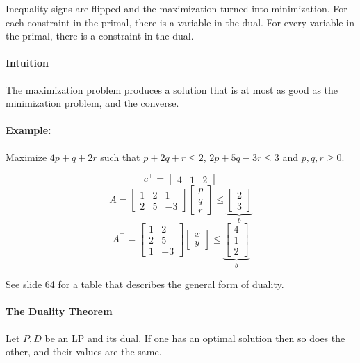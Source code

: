 \documentclass[a4paper]{article}
\begin{document}
Inequality signs are flipped and the maximization turned into minimization. For each constraint in the primal, there is a variable in the dual. For every variable in the primal, there is a constraint in the dual.

\paragraph{Intuition}
The maximization problem produces a solution that is at most as good as the minimization problem, and the converse.

\paragraph{Example:}
Maximize $4p+q+2r$ such that $p + 2q + r \le 2$, $2p+5q-3r \le 3$ and $p,q,r \ge 0$.

\[c^\intercal= \begin{bmatrix}4 & 1 & 2\end{bmatrix}\]
\[A=\begin{bmatrix}1 & 2 & 1 \\ 2 & 5 & -3\end{bmatrix} \begin{bmatrix}p \\ q \\ r\end{bmatrix} \le \underbrace{\begin{bmatrix}2 \\ 3\end{bmatrix}}_{b}\]
\[A^\intercal=\begin{bmatrix}1 & 2 \\ 2 & 5 \\ 1 & -3\end{bmatrix} \begin{bmatrix}x \\ y\end{bmatrix} \le \underbrace{\begin{bmatrix}4 \\ 1 \\ 2\end{bmatrix}}_{b}\]

See slide 64 for a table that describes the general form of duality.

\paragraph{The Duality Theorem}
Let $P, D$ be an LP and its dual.
If one has an optimal solution then so does the other, and their values are the same.
\end{document}
